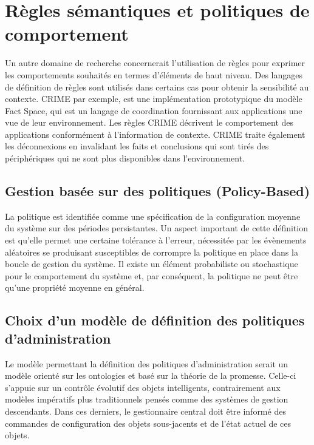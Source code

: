 \section{Règles sémantiques et politiques de comportement}

Un autre domaine de recherche concernerait l'utilisation de règles pour exprimer
les comportements souhaités en termes d'éléments de haut niveau. Des langages
de définition de règles sont utilisés dans certains cas pour obtenir la
sensibilité au contexte. CRIME \cite{murphy_coordination_2007} par exemple, est
une implémentation prototypique du modèle Fact Space, qui est un langage de
coordination fournissant aux applications une vue de leur environnement. Les
règles CRIME décrivent le comportement des applications conformément à
l'information de contexte. CRIME traite également les déconnexions en invalidant
les faits et conclusions qui sont tirés des périphériques qui ne sont plus
disponibles dans l'environnement.

\subsection{Gestion basée sur des politiques (Policy-Based)}

La politique est identifiée comme une spécification de la configuration moyenne
du système sur des périodes persistantes. Un aspect important de cette
définition est qu'elle permet une certaine tolérance à l'erreur, nécessitée par
les évènements aléatoires se produisant susceptibles de corrompre la politique
en place dans la boucle de gestion du système. Il existe un élément probabiliste
ou stochastique pour le comportement du système et, par conséquent, la politique
ne peut être qu'une propriété moyenne en général.

\subsection{Choix d'un modèle de définition des politiques d'administration}

Le modèle permettant la définition des politiques d'administration serait un
modèle orienté sur les ontologies et basé sur la théorie de la promesse.
Celle-ci s'appuie sur un contrôle évolutif des objets intelligents,
contrairement aux modèles impératifs plus traditionnels pensés comme des
systèmes de gestion descendants. Dans ces derniers, le gestionnaire central
doit être informé des commandes de configuration des objets sous-jacents et de
l'état actuel de ces objets.


